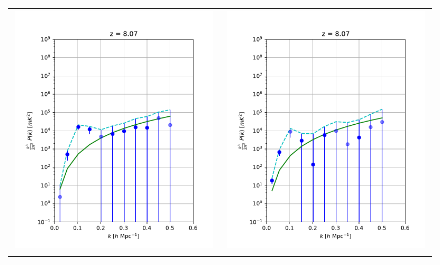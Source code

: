 \begin{figure}
\begin{tabular}{ll}
\includegraphics[scale=0.5]{chapters/psa128_pol/figures/pId_U.pdf} &
\includegraphics[scale=0.5]{chapters/psa128_pol/figures/pId_V.pdf} \\

\end{tabular}
\end{figure}
